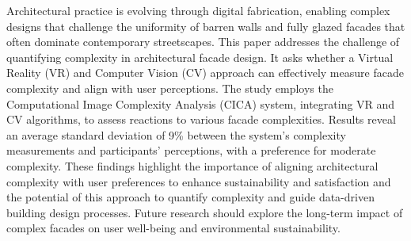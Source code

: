 

Architectural practice is evolving through digital fabrication, enabling complex designs that challenge the uniformity of barren walls and fully glazed facades that often dominate contemporary streetscapes.
This paper addresses the challenge of quantifying complexity in architectural facade design.
It asks whether a Virtual Reality (VR) and Computer Vision (CV) approach can effectively measure facade complexity and align with user perceptions.
The study employs the Computational Image Complexity Analysis (CICA) system, integrating VR and CV algorithms, to assess reactions to various facade complexities.
Results reveal an average standard deviation of 9\% between the system's complexity measurements and participants' perceptions, with a preference for moderate complexity.
These findings highlight the importance of aligning architectural complexity with user preferences to enhance sustainability and satisfaction and the potential of this approach to quantify complexity and guide data-driven building design processes.
Future research should explore the long-term impact of complex facades on user well-being and environmental sustainability.




